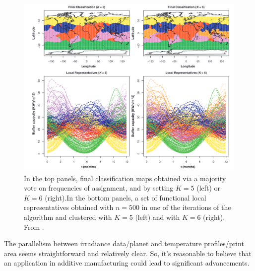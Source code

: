 \begin{figure}
    \centering
    \includegraphics[scale=0.4]{Images/resbagging.png}
    \caption[Classification of irradiance data.]{In the top panels, final classification maps obtained via a majority vote on frequencies of assignment, and by setting $K = 5$ (left) or $K = 6$ (right).In the bottom panels, a set of functional local representatives obtained with $n = 500$ in one of the iterations of the algorithm and clustered with $K = 5$ (left) and with $K=6$ (right). From \citeauthor{secchi_bagging_2013} \citeyear{secchi_bagging_2013}.}
    \label{fig:resbagging}
\end{figure}
The parallelism between irradiance data/planet and temperature profiles/print area seems straightforward and relatively clear. So, it's reasonable to believe that an application in additive manufacturing could lead to significant advancements.
